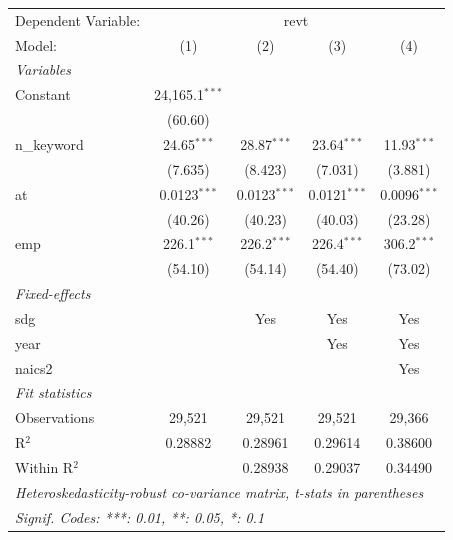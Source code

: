 
\begingroup
\centering
\begin{tabular}{lcccc}
   \tabularnewline \midrule \midrule
   Dependent Variable: & \multicolumn{4}{c}{revt}\\
   Model:       & (1)              & (2)            & (3)            & (4)\\  
   \midrule
   \emph{Variables}\\
   Constant     & 24,165.1$^{***}$ &                &                &   \\   
                & (60.60)          &                &                &   \\   
   n\_keyword   & 24.65$^{***}$    & 28.87$^{***}$  & 23.64$^{***}$  & 11.93$^{***}$\\   
                & (7.635)          & (8.423)        & (7.031)        & (3.881)\\   
   at           & 0.0123$^{***}$   & 0.0123$^{***}$ & 0.0121$^{***}$ & 0.0096$^{***}$\\   
                & (40.26)          & (40.23)        & (40.03)        & (23.28)\\   
   emp          & 226.1$^{***}$    & 226.2$^{***}$  & 226.4$^{***}$  & 306.2$^{***}$\\   
                & (54.10)          & (54.14)        & (54.40)        & (73.02)\\   
   \midrule
   \emph{Fixed-effects}\\
   sdg          &                  & Yes            & Yes            & Yes\\  
   year         &                  &                & Yes            & Yes\\  
   naics2       &                  &                &                & Yes\\  
   \midrule
   \emph{Fit statistics}\\
   Observations & 29,521           & 29,521         & 29,521         & 29,366\\  
   R$^2$        & 0.28882          & 0.28961        & 0.29614        & 0.38600\\  
   Within R$^2$ &                  & 0.28938        & 0.29037        & 0.34490\\  
   \midrule \midrule
   \multicolumn{5}{l}{\emph{Heteroskedasticity-robust co-variance matrix, t-stats in parentheses}}\\
   \multicolumn{5}{l}{\emph{Signif. Codes: ***: 0.01, **: 0.05, *: 0.1}}\\
\end{tabular}
\par\endgroup



